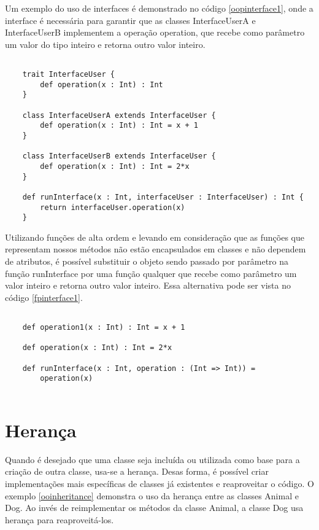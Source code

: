 Um exemplo do uso de interfaces é demonstrado no código 
\ref{oopinterface1}, 
onde a interface é necessária para garantir que as 
classes InterfaceUserA e InterfaceUserB implementem 
a operação operation, que recebe como parâmetro 
um valor do tipo inteiro e retorna outro valor 
inteiro.


\begin{lstlisting}[caption={Interfaces em Orientação a Objetos},label=oopinterface1]
    
    trait InterfaceUser {
        def operation(x : Int) : Int
    }

    class InterfaceUserA extends InterfaceUser {
        def operation(x : Int) : Int = x + 1
    }

    class InterfaceUserB extends InterfaceUser {
        def operation(x : Int) : Int = 2*x
    }

    def runInterface(x : Int, interfaceUser : InterfaceUser) : Int {
        return interfaceUser.operation(x)
    }

\end{lstlisting}

Utilizando funções de alta ordem e levando em 
consideração que as funções que representam nossos 
métodos não estão encapsulados em classes e 
não dependem de atributos, é possível substituir o 
objeto sendo passado por parâmetro na função 
runInterface por uma função qualquer que recebe 
como parâmetro um valor inteiro e retorna outro 
valor inteiro. Essa alternativa pode ser vista 
no código \ref{fpinterface1}.

\begin{lstlisting}[caption={Interfaces em Programação Funcional},label=fpinterface1]
    
    def operation1(x : Int) : Int = x + 1

    def operation(x : Int) : Int = 2*x

    def runInterface(x : Int, operation : (Int => Int)) =
        operation(x)
    
\end{lstlisting}



\section{Herança}

Quando é desejado que uma classe seja incluída ou 
utilizada como base para a criação de outra classe, 
usa-se a herança\cite{quarkoo}. Desas forma, é 
possível criar implementações mais específicas 
de classes já existentes e reaproveitar o código. 
O exemplo \ref{ooinheritance} demonstra 
o uso da herança entre as classes Animal e Dog. 
Ao invés de reimplementar os métodos da classe 
Animal, a classe Dog usa herança para reaproveitá-los. 

